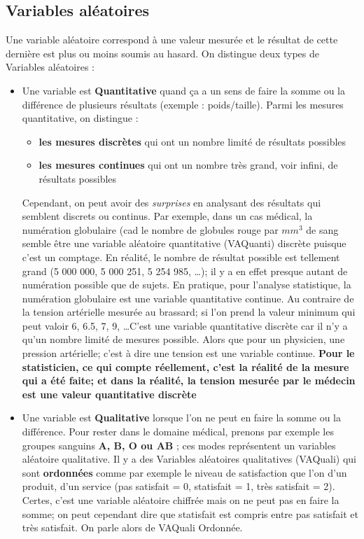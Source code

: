 \subsection{Variables aléatoires}
Une variable aléatoire correspond à une valeur mesurée et le résultat de cette dernière est plus ou moins soumis au hasard.\newline
On distingue deux types de Variables aléatoires : 
\begin{itemize}
\item Une variable est \textbf{Quantitative} quand ça a un sens de faire la somme ou la différence de plusieurs résultats (exemple : poids/taille).\newline
Parmi les mesures quantitative, on distingue : 
\begin{itemize}
\item \textbf{les mesures discrètes} qui ont un nombre limité de résultats possibles
\item \textbf{les mesures continues} qui ont un nombre très grand, voir infini, de résultats possibles
\end{itemize}
Cependant, on peut avoir des \textit{surprises} en analysant des résultats qui semblent discrets ou continus.\newline 
Par exemple, dans un cas médical, la numération globulaire (cad le nombre de globules rouge par $mm^{3}$ de sang semble être une variable aléatoire quantitative (VAQuanti) discrète puisque c'est un comptage. En réalité, le nombre de résultat possible est tellement grand (5 000 000, 5 000 251, 5 254 985, \dots); il y a en effet presque autant de numération possible que de sujets. En pratique, pour l'analyse statistique, la numération globulaire est une variable quantitative continue.\newline 
Au contraire de la tension artérielle mesurée au brassard; si l'on prend la valeur minimum qui peut valoir 6, 6.5, 7, 9, \dots C'est une variable quantitative discrète car il n'y a qu'un nombre limité de mesures possible. Alors que pour un physicien, une pression artérielle; c'est à dire une tension est une variable continue.\newline
\textbf{Pour le statisticien, ce qui compte réellement, c'est la réalité de la mesure qui a été faite; et dans la réalité, la tension mesurée par le médecin est une valeur quantitative discrète} 

\item Une variable est \textbf{Qualitative} lorsque l'on ne peut en faire la somme ou la différence.\newline
Pour rester dans le domaine médical, prenons par exemple les groupes sanguins \textbf{A, B, O ou AB} ; ces modes représentent un variables aléatoire qualitative.\newline
Il y a des Variables aléatoires qualitatives (VAQuali) qui sont \textbf{ordonnées} comme par exemple le niveau de satisfaction que l'on d'un produit, d'un service (pas satisfait = 0, statisfait = 1, très satisfait = 2). Certes, c'est une variable aléatoire chiffrée mais on ne peut pas en faire la somme; on peut cependant dire que statisfait est compris entre pas satisfait et très satisfait. On parle alors de VAQuali Ordonnée.
\end{itemize}
